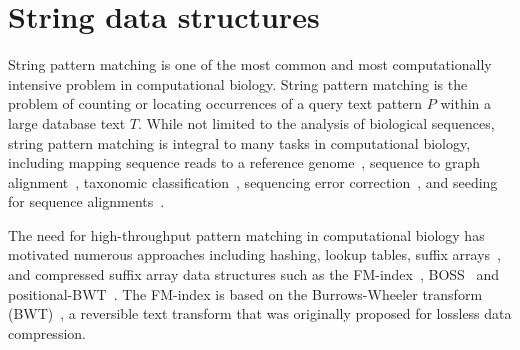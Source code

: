 \section{String data structures}

%
String pattern matching is one of the most common and most computationally intensive problem in computational biology.
%
String pattern matching is the problem of counting or locating occurrences of a query text pattern $P$ within a large database text $T$. While not limited to the analysis of biological sequences, string pattern matching is integral to many tasks in computational biology, including mapping sequence reads to a reference genome~\cite{li2009fast,langmead2009ultrafast}, sequence to graph alignment~\cite{Jain2020}, taxonomic classification~\cite{menzel2016fast,kim2016centrifuge}, sequencing error correction~\cite{huang2017efficient}, and seeding for sequence alignments~\cite{buchfink2015fast,altschul1990basic,steinegger2017mmseqs2}.

The need for high-throughput pattern matching in computational biology has motivated numerous approaches including hashing, lookup tables, suffix arrays~\cite{manber1993suffix}, and compressed suffix array data structures such as the FM-index~\cite{ferragina2000opportunistic}, BOSS~\cite{Muggli2019} and positional-BWT~\cite{Durbin2014}.
The FM-index is based on the Burrows-Wheeler transform (BWT)~\cite{burrows1994block}, a reversible text transform that was originally proposed for lossless data compression.



